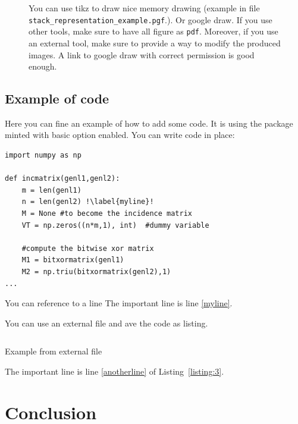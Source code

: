 \documentclass{article}
\begin{document}
\begin{figure}[tbh]
\centering

 \caption{You can use tikz to draw nice memory drawing (example in file \texttt{stack\_representation\_example.pgf}.). Or google draw.  If you use other tools, make sure to have all figure as \texttt{pdf}. Moreover, if you use an external tool, make sure to provide a way to modify the produced images. A link to google draw with correct permission is good enough.}
\label{general-stolen-api}
\end{figure} 


\subsection{Example of code}
Here you can fine an example of how to add some code. It is using the package minted with basic option enabled.
You can write code in place:
\begin{verbatim}
import numpy as np
    
def incmatrix(genl1,genl2):
    m = len(genl1)
    n = len(genl2) !\label{myline}!
    M = None #to become the incidence matrix
    VT = np.zeros((n*m,1), int)  #dummy variable
    
    #compute the bitwise xor matrix
    M1 = bitxormatrix(genl1)
    M2 = np.triu(bitxormatrix(genl2),1) 
...
\end{verbatim}
You can reference to a line
The important line is line \ref{myline}.

You can use an external file and ave the code as listing.
\begin{listing}[ht]
\inputminted[linenos, bgcolor=black, escapeinside=!!]{python}{x.py}
\caption{Example from external file}
\label{listing:3}
\end{listing}
 
The important line is line \ref{anotherline} of Listing~\ref{listing:3}.

\section{Conclusion}




\end{document}
